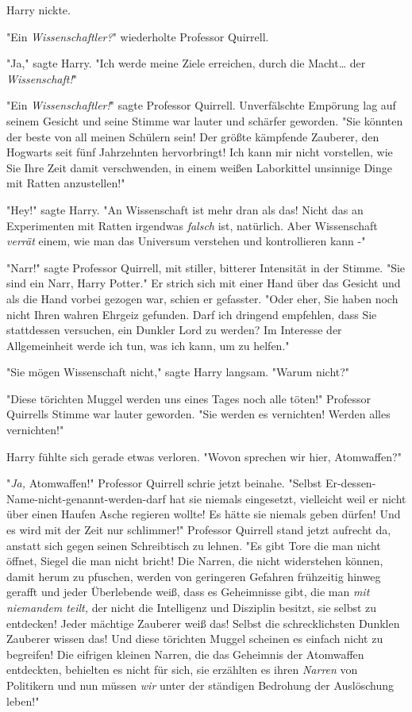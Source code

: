 {Harry nickte.

"Ein \emph{Wissenschaftler?}" wiederholte Professor Quirrell.

"Ja," sagte Harry. "Ich werde meine Ziele erreichen, durch die Macht… der \emph{Wissenschaft!}"

"Ein \emph{Wissenschaftler!}" sagte Professor Quirrell. Unverfälschte Empörung lag auf seinem Gesicht und seine Stimme war lauter und schärfer geworden. "Sie könnten der beste von all meinen Schülern sein! Der größte kämpfende Zauberer, den Hogwarts seit fünf Jahrzehnten hervorbringt! Ich kann mir nicht vorstellen, wie Sie Ihre Zeit damit verschwenden, in einem weißen Laborkittel unsinnige Dinge mit Ratten anzustellen!"

"Hey!" sagte Harry. "An Wissenschaft ist mehr dran als das! Nicht das an Experimenten mit Ratten irgendwas \emph{falsch} ist, natürlich. Aber Wissenschaft \emph{verrät} einem, wie man das Universum verstehen und kontrollieren kann -"

"Narr!" sagte Professor Quirrell, mit stiller, bitterer Intensität in der Stimme. "Sie sind ein Narr, Harry Potter." Er strich sich mit einer Hand über das Gesicht und als die Hand vorbei gezogen war, schien er gefasster. "Oder eher, Sie haben noch nicht Ihren wahren Ehrgeiz gefunden. Darf ich dringend empfehlen, dass Sie stattdessen versuchen, ein Dunkler Lord zu werden? Im Interesse der Allgemeinheit werde ich tun, was ich kann, um zu helfen."

"Sie mögen Wissenschaft nicht," sagte Harry langsam. "Warum nicht?"

"Diese törichten Muggel werden uns eines Tages noch alle töten!" Professor Quirrells Stimme war lauter geworden. "Sie werden es vernichten! Werden alles vernichten!"

Harry fühlte sich gerade etwas verloren. "Wovon sprechen wir hier, Atomwaffen?"

"\emph{Ja,} Atomwaffen!" Professor Quirrell schrie jetzt beinahe. "Selbst Er-dessen-Name-nicht-genannt-werden-darf hat sie niemals eingesetzt, vielleicht weil er nicht über einen Haufen Asche regieren wollte! Es hätte sie niemals geben dürfen! Und es wird mit der Zeit nur schlimmer!" Professor Quirrell stand jetzt aufrecht da, anstatt sich gegen seinen Schreibtisch zu lehnen. "Es gibt Tore die man nicht öffnet, Siegel die man nicht bricht! Die Narren, die nicht widerstehen können, damit herum zu pfuschen, werden von geringeren Gefahren frühzeitig hinweg gerafft und jeder Überlebende weiß, dass es Geheimnisse gibt, die man \emph{mit niemandem teilt,} der nicht die Intelligenz und Disziplin besitzt, sie selbst zu entdecken! Jeder mächtige Zauberer weiß das! Selbst die schrecklichsten Dunklen Zauberer wissen das! Und diese törichten Muggel scheinen es einfach nicht zu begreifen! Die eifrigen kleinen Narren, die das Geheimnis der Atomwaffen entdeckten, behielten es nicht für sich, sie erzählten es ihren \emph{Narren} von Politikern und nun müssen \emph{wir} unter der ständigen Bedrohung der Auslöschung leben!"

}
